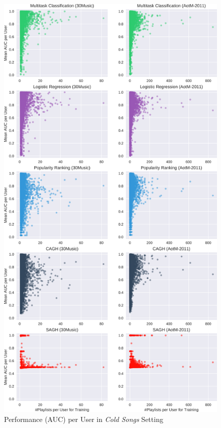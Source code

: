 \begin{figure}[!t]
    \centering
    \includegraphics[height=\textheight]{fig/auc_per_user0.png}
    \caption{Performance (AUC) per User in \emph{Cold Songs} Setting}
\end{figure}

